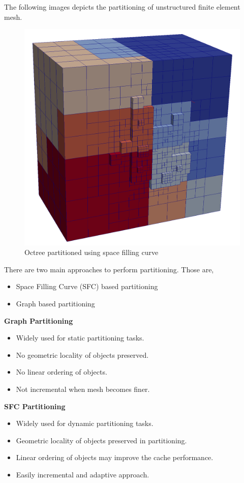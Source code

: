 \documentclass[a0,landscape]{a0poster}
\begin{document}
\begin{multicols}{4}
The following images depicts the partitioning of unstructured finite element mesh. 

\begin{figure}[H]
\centering
\includegraphics[width=0.6\linewidth,keepaspectratio]{morton.png}
\caption{ Octree partitioned using space filling curve \label{usMesh_w_partitioning}}
\end{figure}

There are two main approaches to perform partitioning. Those are, 
\begin{itemize}
 \item Space Filling Curve (SFC) based partitioning
 \item Graph based partitioning
\end{itemize}

\color{black}
\begin{multicols}{2}
\textbf{Graph Partitioning}
\begin{itemize}
 \item Widely used for static partitioning tasks.
 \item No geometric locality of objects preserved.
 \item No linear ordering of objects.
 \item Not incremental when mesh becomes finer.
\end{itemize}
\columnbreak
\textbf{SFC Partitioning}
\begin{itemize}
 \item Widely used for dynamic partitioning tasks.
 \item Geometric locality of objects preserved in partitioning.
 \item Linear ordering of objects may improve the cache performance.
 \item Easily incremental and adaptive approach.
\end{itemize}
\end{multicols}



\end{multicols}
\end{document}
